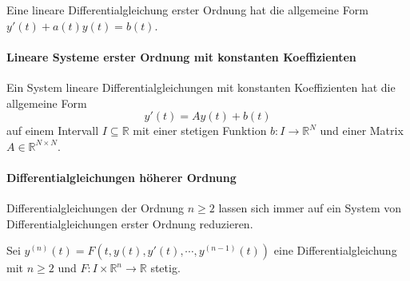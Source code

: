 \documentclass[a4paper, 11pt, accentcolor = tud3b]{tudreport}
\begin{document}
            Eine lineare Differentialgleichung erster Ordnung hat die allgemeine Form $ y'(t) + a(t)y(t) = b(t) $.

        \paragraph{Lineare Systeme erster Ordnung mit konstanten Koeffizienten}
            Ein System lineare Differentialgleichungen mit konstanten Koeffizienten hat die allgemeine Form
            \begin{equation*}
                y'(t) = Ay(t) + b(t)
            \end{equation*}
            auf einem Intervall $ I \subseteq \mathbb{R} $ mit einer stetigen Funktion $ b : I \rightarrow \mathbb{R} ^ N $ und einer Matrix $ A \in \mathbb{R} ^ { N \times N } $.

        \paragraph{Differentialgleichungen höherer Ordnung}
            Differentialgleichungen der Ordnung $ n \geq 2 $ lassen sich immer auf ein System von Differentialgleichungen erster Ordnung reduzieren.

            Sei $ y ^ {(n)} (t) = F(t, y(t), y'(t), \cdots, y ^ {(n - 1)} (t)) $ eine Differentialgleichung mit $ n \geq 2 $ und $ F : I \times \mathbb{R} ^ n \rightarrow \mathbb{R} $ stetig.
\end{document}
